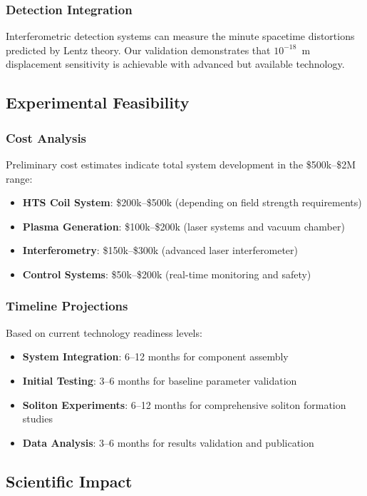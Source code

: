 \documentclass[12pt,a4paper]{article}
\begin{document}
\subsubsection{Detection Integration}
Interferometric detection systems can measure the minute spacetime distortions predicted by Lentz theory. Our validation demonstrates that $10^{-18}$~m displacement sensitivity is achievable with advanced but available technology.

\subsection{Experimental Feasibility}

\subsubsection{Cost Analysis}
Preliminary cost estimates indicate total system development in the \$500k--\$2M range:
\begin{itemize}
\item \textbf{HTS Coil System}: \$200k--\$500k (depending on field strength requirements)
\item \textbf{Plasma Generation}: \$100k--\$200k (laser systems and vacuum chamber)
\item \textbf{Interferometry}: \$150k--\$300k (advanced laser interferometer)
\item \textbf{Control Systems}: \$50k--\$200k (real-time monitoring and safety)
\end{itemize}

\subsubsection{Timeline Projections}
Based on current technology readiness levels:
\begin{itemize}
\item \textbf{System Integration}: 6--12 months for component assembly
\item \textbf{Initial Testing}: 3--6 months for baseline parameter validation
\item \textbf{Soliton Experiments}: 6--12 months for comprehensive soliton formation studies
\item \textbf{Data Analysis}: 3--6 months for results validation and publication
\end{itemize}

\subsection{Scientific Impact}
\end{document}

